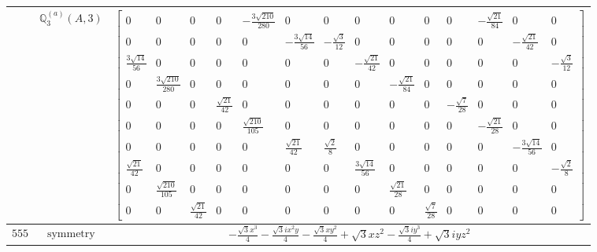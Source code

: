 \documentclass[fleqn,8pt,landscape]{jsarticle}
\begin{document}
\begin{longtable}{ccc}
$  $ & $ \mathbb{Q}_{3}^{(a)}(A,3) $ & $ \begin{bmatrix} 0 & 0 & 0 & 0 & - \frac{3 \sqrt{210}}{280} & 0 & 0 & 0 & 0 & 0 & 0 & - \frac{\sqrt{21}}{84} & 0 & 0 \\ 0 & 0 & 0 & 0 & 0 & - \frac{3 \sqrt{14}}{56} & - \frac{\sqrt{3}}{12} & 0 & 0 & 0 & 0 & 0 & - \frac{\sqrt{21}}{42} & 0 \\ \frac{3 \sqrt{14}}{56} & 0 & 0 & 0 & 0 & 0 & 0 & - \frac{\sqrt{21}}{42} & 0 & 0 & 0 & 0 & 0 & - \frac{\sqrt{3}}{12} \\ 0 & \frac{3 \sqrt{210}}{280} & 0 & 0 & 0 & 0 & 0 & 0 & - \frac{\sqrt{21}}{84} & 0 & 0 & 0 & 0 & 0 \\ 0 & 0 & 0 & \frac{\sqrt{21}}{42} & 0 & 0 & 0 & 0 & 0 & 0 & - \frac{\sqrt{7}}{28} & 0 & 0 & 0 \\ 0 & 0 & 0 & 0 & \frac{\sqrt{210}}{105} & 0 & 0 & 0 & 0 & 0 & 0 & - \frac{\sqrt{21}}{28} & 0 & 0 \\ 0 & 0 & 0 & 0 & 0 & \frac{\sqrt{21}}{42} & \frac{\sqrt{2}}{8} & 0 & 0 & 0 & 0 & 0 & - \frac{3 \sqrt{14}}{56} & 0 \\ \frac{\sqrt{21}}{42} & 0 & 0 & 0 & 0 & 0 & 0 & \frac{3 \sqrt{14}}{56} & 0 & 0 & 0 & 0 & 0 & - \frac{\sqrt{2}}{8} \\ 0 & \frac{\sqrt{210}}{105} & 0 & 0 & 0 & 0 & 0 & 0 & \frac{\sqrt{21}}{28} & 0 & 0 & 0 & 0 & 0 \\ 0 & 0 & \frac{\sqrt{21}}{42} & 0 & 0 & 0 & 0 & 0 & 0 & \frac{\sqrt{7}}{28} & 0 & 0 & 0 & 0 \end{bmatrix} $ \\ \hline
$ 555 $ & $ \text{symmetry} $ & $ - \frac{\sqrt{3} x^{3}}{4} - \frac{\sqrt{3} i x^{2} y}{4} - \frac{\sqrt{3} x y^{2}}{4} + \sqrt{3} x z^{2} - \frac{\sqrt{3} i y^{3}}{4} + \sqrt{3} i y z^{2} $ \\

\end{longtable}
\end{document}
